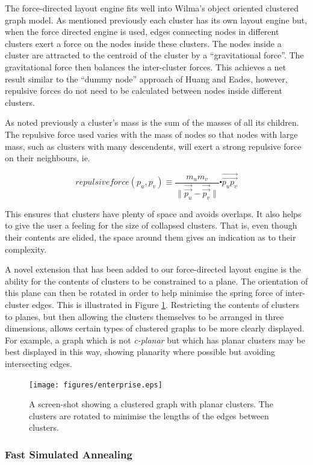 \documentclass[runningheads]{cl2emult}
\newcommand{\avec}[1]{\vec{\overrightarrow{ #1}}}
\begin{document}
The force-directed layout engine fits well into Wilma's object
oriented clustered graph model.  As mentioned previously each cluster
has its own layout engine but, when the force directed engine is used,
edges connecting nodes in different clusters exert a force on
the nodes inside these clusters.  The nodes inside a cluster are
attracted to the centroid of the cluster by a ``gravitational force''.
The gravitational force then balances the inter-cluster forces.  This
achieves a net result similar to the ``dummy node'' approach of Huang
and Eades\cite{Huang:GD98}, however, repulsive forces do not need to be
calculated between nodes inside different clusters.

As noted previously a cluster's mass is the sum of the masses of all
its children.
The repulsive force used varies with the mass of nodes so
that nodes with large mass, such as clusters with many descendents,
will exert a strong repulsive force on their neighbours, ie.

\[
\mathit{repulsiveforce}(p_u,p_v) \equiv \frac{m_u m_v}{\|\avec{p_u}-\avec{p_v}\|}
\centerdot \avec{p_u p_v}
\]

This ensures
that clusters have plenty of space and avoids overlaps.  It also helps
to give the user a feeling for the size of collapsed clusters.  That is, even
though their contents are elided, the space around them gives an
indication as to their complexity.

A novel extension that has been added to our force-directed layout
engine is the ability for the contents of clusters to be constrained
to a plane.  The orientation of this plane can then be rotated in
order to help minimise the spring force of inter-cluster edges.  This
is illustrated in Figure \ref{fig-spincluster}.  Restricting the
contents of clusters to planes, but then allowing the clusters
themselves to be arranged in three dimensions, allows certain types of
clustered
graphs to be more clearly displayed.  For example, a graph which is not
{\em c-planar}\cite{Eades:GD96} but which has planar clusters may be best
displayed in this way, showing planarity where possible but avoiding
intersecting edges.
\begin{figure}[h]
  \centering
    \texttt{[image: figures/enterprise.eps]}
  \caption{A screen-shot showing a clustered graph with planar
  clusters.  The clusters are rotated to minimise the lengths of the
  edges between clusters.}
  \label{fig-spincluster}
\end{figure}

\subsubsection{Fast Simulated Annealing}
\end{document}
